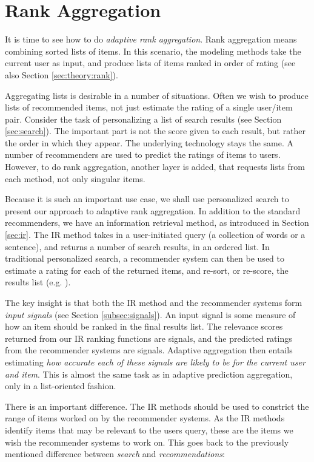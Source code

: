\section{Rank Aggregation}
\label{sec:methods:rank}

It is time to see how to do \emph{adaptive rank aggregation}. 
Rank aggregation means combining sorted lists of items.
In this scenario, the modeling methods take the current user as input, and produce 
lists of items ranked in order of rating (see also Section \ref{sec:theory:rank}).

Aggregating lists is desirable in a number of situations.
Often we wish to produce lists of recommended items, not just estimate the rating of a single user/item pair.
Consider the task of personalizing a list of search results
(see Section \ref{sec:search}). The important part is not the score
given to each result, but rather the order in which they appear.
The underlying technology stays the same. A number of recommenders are used to predict the ratings
of items to users. However, to do rank aggregation, another layer is added, that requests lists from each method,
not only singular items.

Because it is such an important use case, we shall use personalized search to present our approach to adaptive rank aggregation.
In addition to the standard recommenders, we have an information retrieval method,
as introduced in Section \ref{sec:ir}.
The IR method takes in a user-initiated query (a collection of words or a sentence), and returns a number of 
search results, in an ordered list.
In traditional personalized search, a recommender system can then be used to estimate a rating for each of the returned items,
and re-sort, or re-score, the results list (e.g. \citet[p3]{Xu2008}).

The key insight is that both the IR method and the recommender systems form \emph{input signals}
(see Section \ref{subsec:signals}).
An input signal is some measure of how an item should be ranked in the final results list.
The relevance scores returned from our IR ranking functions are signals,
and the predicted ratings from the recommender systems are signals.
Adaptive aggregation then entails estimating \emph{how accurate each of these signals are likely to be for the current user and item}.
This is almost the same task as in adaptive prediction aggregation, only in a list-oriented fashion.

There is an important difference. 
The IR methods should be used to constrict the range of items worked on by the recommender systems.
As the IR methods identify items that may be relevant to the users query, these are the items we wish the recommender systems to work on.
This goes back to the previously mentioned difference between \emph{search} and \emph{recommendations}:

